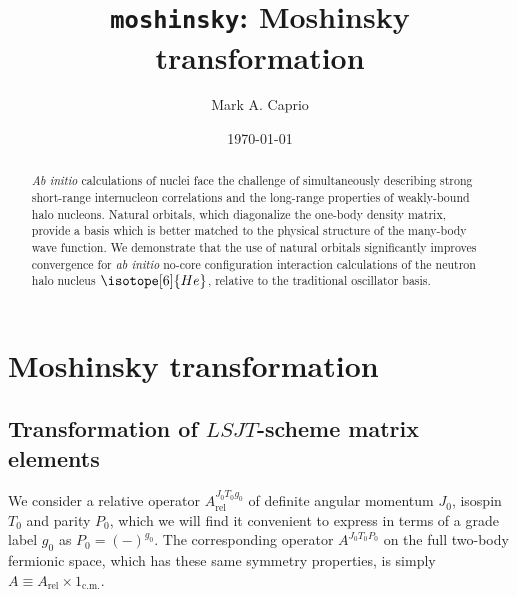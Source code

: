 \documentclass[aps,groupedaddress,onecolumn,11pt,floatfix]{revtex4}
\newcommand{\mathds}{}
\newcommand{\Arel}{A_\text{rel}}
\newcommand{\unitycm}{{\mathds{1}_{\text{c.m.}}}}
\begin{document}
\title{\texttt{moshinsky}: Moshinsky transformation}

\author{Mark A. Caprio}

\date{\today}

\begin{abstract}
\textit{Ab initio} calculations of nuclei face the challenge of
simultaneously describing strong short-range internucleon correlations
and the long-range properties of weakly-bound halo nucleons.  Natural
orbitals, which diagonalize the one-body density matrix, provide a
basis which is better matched to the physical structure of the
many-body wave function.  We demonstrate that the use of natural
orbitals significantly improves convergence for \textit{ab initio}
no-core configuration interaction calculations of the neutron halo
nucleus $\isotope[6]{He}$, relative to the traditional oscillator
basis.
\end{abstract}


\maketitle



\section{Moshinsky transformation}

\subsection{Transformation of $LSJT$-scheme matrix elements}

We consider a relative operator $\Arel^{J_0T_0g_0}$ of definite
angular momentum $J_0$, isospin $T_0$ and parity $P_0$, which we will
find it convenient to express
in terms of a grade label $g_0$ as $P_0=(-)^{g_0}$.  The
corresponding operator $A^{J_0T_0P_0}$ on the full two-body fermionic
space, which 
 has these same symmetry
properties, is simply $A\equiv\Arel\times\unitycm$.
\end{document}
